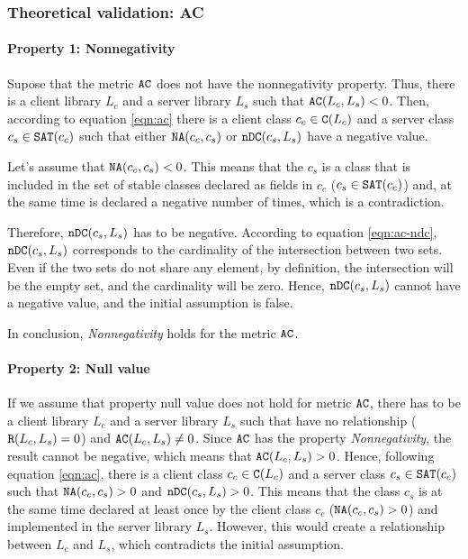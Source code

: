 \subsubsection{Theoretical validation: AC}

\paragraph{Property 1: Nonnegativity}
Supose that the metric $\verb|AC|$ does not have the nonnegativity property. Thus, there is a client library $L_c$ and a server library $L_s$ such that $\verb|AC|(L_c, L_s) < 0$. Then, according to equation \ref{eqn:ac} there is a client class $c_c \in \verb|C|(L_c)$ and a server class $c_s \in \verb|SAT|(c_c)$ such that either $\verb|NA|(c_c, c_s)$ or $\verb|nDC|(c_s, L_s)$ have a negative value.

Let's assume that $\verb|NA|(c_c, c_s) < 0$. This means that the $c_s$ is a class that is included in the set of stable classes declared as fields in $c_c$ ($c_s \in \verb|SAT|(c_c)$) and, at the same time is declared a negative number of times, which is a contradiction.

Therefore, $\verb|nDC|(c_s, L_s)$ has to be negative. According to equation \ref{eqn:ac-ndc}, $\verb|nDC|(c_s, L_s)$ corresponds to the cardinality of the intersection between two sets. Even if the two sets do not share any element, by definition, the intersection will be the empty set, and the cardinality will be zero. Hence, $\verb|nDC|(c_s, L_s)$ cannot have a negative value, and the initial assumption is false.

In conclusion, \textit{Nonnegativity} holds for the metric $\verb|AC|$.

\paragraph{Property 2: Null value}
If we assume that property null value does not hold for metric $\verb|AC|$, there has to be a client library $L_c$ and a server library $L_s$ such that have no relationship ($\verb|R|(L_c, L_s) = 0$) and $\verb|AC|(L_c, L_s)	\neq 0$. Since $\verb|AC|$ has the property \textit{Nonnegativity}, the result cannot be negative, which means that $\verb|AC|(L_c, L_s) > 0$. Hence, following equation \ref{eqn:ac}, there is a client class $c_c \in \verb|C|(L_c)$ and a server class $c_s \in \verb|SAT|(c_c)$ such that $\verb|NA|(c_c, c_s) > 0$ and $\verb|nDC|(c_s, L_s) > 0$. This means that the class $c_s$ is at the same time declared at least once by the client class $c_c$ ($\verb|NA|(c_c, c_s) > 0$) and implemented in the server library $L_s$. However, this would create a relationship between $L_c$ and $L_s$, which contradicts the initial assumption.


